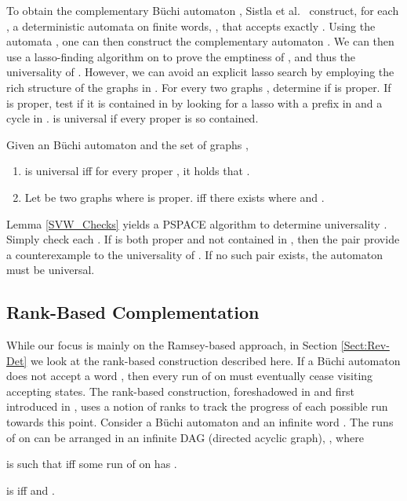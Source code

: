 \documentclass{LMCS}
\newcommand\buchi{B\"uchi }
\begin{document}
To obtain the complementary \buchi automaton ,  Sistla et al.~
construct, for each , a deterministic automata on
finite words, , that accepts exactly . Using the automata , one can then
construct the complementary automaton  \cite{SVW85}. We can then
use a lasso-finding algorithm on  to prove the emptiness of
, and thus the universality of .  However, we can avoid an
explicit lasso search by employing the rich structure of the graphs in
. For every two graphs ,
determine if  is proper.  If  is proper, test if it is
contained in  by looking for a lasso with a prefix in  and a
cycle in .   is universal if every proper  is so
contained. 


\begin{lem}\label{SVW_Checks}{\rm \cite{SVW85}}
Given an \buchi automaton  and the set of graphs ,
\begin{enumerate}[\em(1)]
\item  is universal iff for every proper , it holds that .
\item Let  be two graphs where 
is proper.  iff there exists  where  and .  
\end{enumerate}
\end{lem}

Lemma \ref{SVW_Checks} yields a PSPACE algorithm to determine universality
\cite{SVW85}.  Simply check each .  If
 is both proper and not contained in , then the pair
 provide a counterexample to the universality of
. If no such pair exists, the automaton must be universal.

\subsection{Rank-Based Complementation}\label{Rank-Based}

While our focus is mainly on the Ramsey-based approach, in Section \ref{Sect:Rev-Det} we 
look at the rank-based construction described here. If a \buchi automaton  does not accept a
word , then every run of  on  must eventually cease visiting accepting states.  The
rank-based construction, foreshadowed in \cite{Kla90} and first introduced in \cite{KV97b}, uses a notion of ranks to track the
progress of each possible run towards this point.  Consider a \buchi automaton  and an infinite word . The runs of  on  can be
arranged in an infinite DAG (directed acyclic graph), , where 

\begin{iteMize}{}
\item  is such that  iff some run  of
 on  has .
\item  is
 iff  and .
\end{iteMize}
\end{document}
